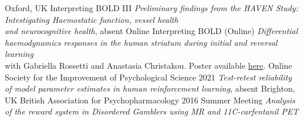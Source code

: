 {Oxford, UK}
{Interpreting BOLD III}
{\emph{Preliminary findings from the HAVEN Study: Intestigating Haemostatic function, vessel health\\
and neurocognitive health}, \footnotesize absent}
\vspace{0.5em}
{Online}
{Interpreting BOLD (Online)}
{\emph{Differential haemodynamics responses in the human striatum during initial and reversal learning}\\
\footnotesize with Gabriella Rossetti and Anastasia Christakou. Poster available \href{https://github.com/sohaamir/misc_materials/tree/main/posters}{here}.}
\vspace{0.5em}
\datedsubsectionnarrow{}
{Online}
{Society for the Improvement of Psychological Science 2021}
{\emph{Test-retest reliability of model parameter estimates in human reinforcement learning}, \footnotesize absent}
\vspace{0.5em}
{Brighton, UK}
{British Association for Psychopharmacology 2016 Summer Meeting}
{\emph{Analysis of the reward system in Disordered Gamblers using MR and 11C-carfentanil PET}}
